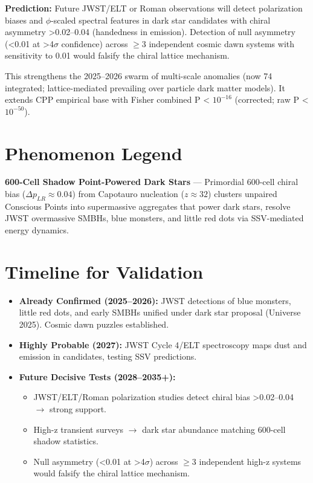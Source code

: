\documentclass[11pt]{article}
\begin{document}
\textbf{Prediction:} Future JWST/ELT or Roman observations will detect polarization biases and $\phi$-scaled spectral features in dark star candidates with chiral asymmetry >0.02--0.04 (handedness in emission). Detection of null asymmetry (<0.01 at >4$\sigma$ confidence) across $\geq 3$ independent cosmic dawn systems with sensitivity to 0.01 would falsify the chiral lattice mechanism.

This strengthens the 2025--2026 swarm of multi-scale anomalies (now 74 integrated; lattice-mediated prevailing over particle dark matter models). It extends CPP empirical base with Fisher combined P < $10^{-16}$ (corrected; raw P < $10^{-50}$).

\section{Phenomenon Legend}
\textbf{600-Cell Shadow Point-Powered Dark Stars} — Primordial 600-cell chiral bias ($\Delta p_{LR} \approx 0.04$) from Capotauro nucleation ($z \approx 32$) clusters unpaired Conscious Points into supermassive aggregates that power dark stars, resolve JWST overmassive SMBHs, blue monsters, and little red dots via SSV-mediated energy dynamics.

\section{Timeline for Validation}
\begin{itemize}
    \item \textbf{Already Confirmed (2025--2026):} JWST detections of blue monsters, little red dots, and early SMBHs unified under dark star proposal (Universe 2025). Cosmic dawn puzzles established.
    \item \textbf{Highly Probable (2027):} JWST Cycle 4/ELT spectroscopy maps dust and emission in candidates, testing SSV predictions.
    \item \textbf{Future Decisive Tests (2028--2035+):}
    \begin{itemize}
        \item JWST/ELT/Roman polarization studies detect chiral bias >0.02--0.04 $\to$ strong support.
        \item High-z transient surveys $\to$ dark star abundance matching 600-cell shadow statistics.
        \item Null asymmetry (<0.01 at >4$\sigma$) across $\geq 3$ independent high-z systems would falsify the chiral lattice mechanism.
    \end{itemize}
\end{itemize}
\end{document}
